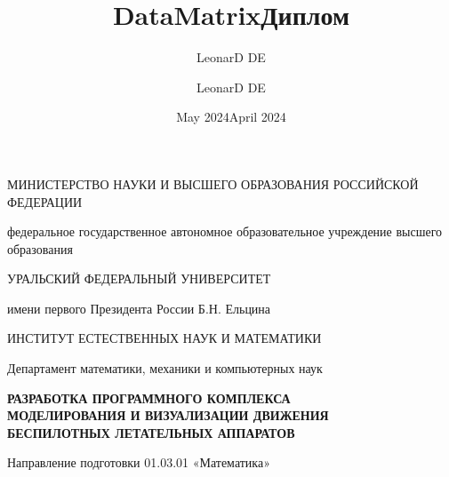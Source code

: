 \documentclass[a4paper,12pt]{article}
\title{DataMatrix}
\author{LeonarD DE}
\date{May 2024}
\title{Диплом}
\author{LeonarD DE}
\date{April 2024}
\numberwithin{figure}{subsubsection}
\begin{document}

\begin{titlepage}

\begin{center}
\MakeUppercase{министерство науки и высшего образования Российской Федерации} 

федеральное государственное автономное образовательное учреждение высшего образования

\MakeUppercase{уральский федеральный университет} 

имени первого Президента России Б.Н. Ельцина
\end{center}

\vspace{5mm}

\begin{center}    
  \MakeUppercase{институт естественных наук и математики} 
\end{center}

\vspace{20mm}

\begin{center}
  Департамент математики, механики и компьютерных наук
\end{center}

\vspace{10mm}

\begin{center}
    \bfseries \MakeUppercase{Разработка программного комплекса\\ моделирования и визуализации движения\\ беспилотных летательных аппаратов}
\end{center}

\vspace{5mm}

\begin{center}
    Направление подготовки 01.03.01 «Математика»
\end{center}

\vspace{20mm}

\newlength\savedwidth

\newcommand\whline[1]{%
  \noalign{%
    \global\savedwidth\arrayrulewidth\global\arrayrulewidth 1.5pt%
  }%
  \cline{#1}%
  \noalign{\vskip\arrayrulewidth}%
  \noalign{\global\arrayrulewidth\savedwidth}%
}


\end{titlepage}
\end{document}
